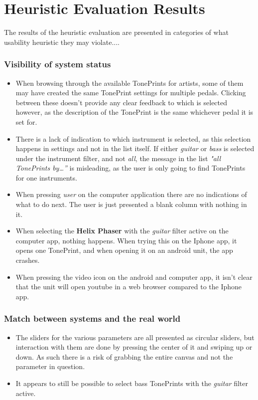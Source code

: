\section{Heuristic Evaluation Results}
\label{Heuristic_Results}
The results of the heuristic evaluation are presented in categories of what usability heuristic they may violate....

\subsubsection{Visibility of system status}
\begin{itemize}
	\item When browsing through the available TonePrints for artists, some of them may have created the same TonePrint settings for multiple pedals. Clicking between these doesn’t provide any clear feedback to which is selected however, as the description of the TonePrint is the same whichever pedal it is set for.\\
	\item There is a lack of indication to which instrument is selected, as this selection happens in settings and not in the list itself. If either \textit{guitar} or \textit{bass} is selected under the instrument filter, and not \textit{all}, the message in the list \textit{"all TonePrints by…”} is misleading, as the user is only going to find TonePrints for one instruments.\\
	\item When pressing \textit{user} on the computer application there are no indications of what to do next. The user is just presented a blank column with nothing in it.\\
	\item When selecting the \textbf{Helix Phaser} with the \textit{guitar} filter active on the computer app, nothing happens. When trying this on the Iphone app, it opens one TonePrint, and when opening it on an android unit, the app crashes.\\
	\item When pressing the video icon on the android and computer app, it isn't clear that the unit will open youtube in a web browser compared to the Iphone app.
\end{itemize}
%
\subsubsection{Match between systems and the real world}
\begin{itemize}
	\item The sliders for the various parameters are all presented as circular sliders, but interaction with them are done by pressing the center of it and swiping up or down. As such there is a risk of grabbing the entire canvas and not the parameter in question.\\
	\item It appears to still be possible to select bass TonePrints with the \textit{guitar} filter active.
\end{itemize}
%
